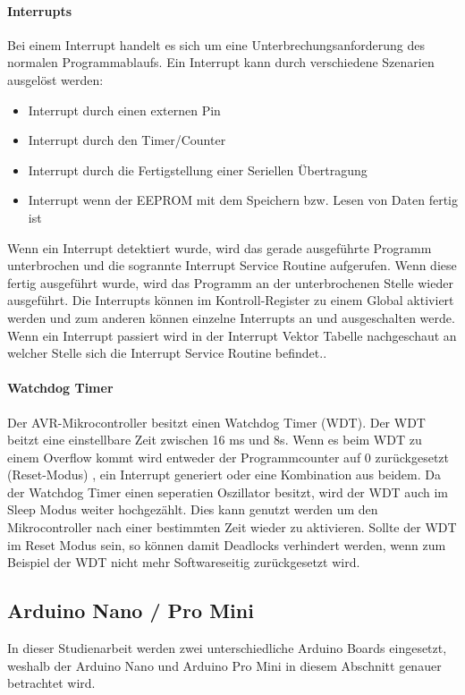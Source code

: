 \paragraph{Interrupts}
Bei einem Interrupt handelt es sich um eine Unterbrechungsanforderung des normalen Programmablaufs. Ein Interrupt kann durch verschiedene Szenarien ausgelöst werden:
\begin{itemize}
	\item Interrupt durch einen externen Pin
	\item Interrupt durch den Timer/Counter
	\item Interrupt durch die Fertigstellung einer Seriellen Übertragung
	\item Interrupt wenn der EEPROM mit dem Speichern bzw. Lesen von Daten fertig ist
\end{itemize}
Wenn ein Interrupt detektiert wurde, wird das gerade ausgeführte Programm unterbrochen und die sogrannte Interrupt Service Routine aufgerufen. Wenn diese fertig ausgeführt wurde, wird das Programm an der unterbrochenen Stelle wieder ausgeführt. 
Die Interrupts können im Kontroll-Register zu einem Global aktiviert werden und zum anderen können einzelne Interrupts an und ausgeschalten werde. Wenn ein Interrupt passiert wird in der Interrupt Vektor Tabelle nachgeschaut an welcher Stelle sich die Interrupt Service Routine befindet..
\paragraph{Watchdog Timer}
Der AVR-Mikrocontroller besitzt einen Watchdog Timer (\ac{WDT}). Der WDT beitzt eine einstellbare Zeit zwischen 16 ms und 8s. Wenn es beim WDT zu einem Overflow kommt wird entweder der Programmcounter auf 0 zurückgesetzt (Reset-Modus) , ein Interrupt generiert oder eine Kombination aus beidem. Da der Watchdog Timer einen seperatien Oszillator besitzt, wird der  WDT auch im Sleep Modus weiter hochgezählt. Dies kann genutzt werden um den Mikrocontroller nach einer bestimmten Zeit wieder zu aktivieren. Sollte der WDT im Reset Modus sein, so können damit Deadlocks verhindert werden, wenn zum Beispiel der WDT nicht mehr Softwareseitig zurückgesetzt wird.

\subsection{Arduino Nano /  Pro Mini}
In dieser Studienarbeit werden zwei unterschiedliche Arduino Boards eingesetzt, weshalb der Arduino Nano und Arduino Pro Mini in diesem Abschnitt genauer betrachtet wird.

